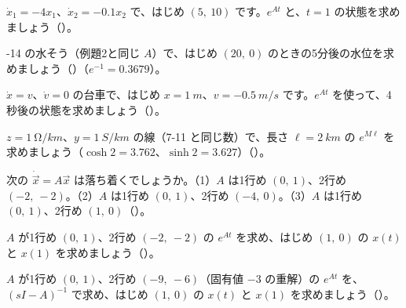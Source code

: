 \bkendproblems
{}

\bkproblem $\dot x_1=-4x_1$、$\dot x_2=-0.1x_2$ で、はじめ $(5,\ 10)$ です。$e^{At}$ と、$t=1$ の状態を求めましょう\mbox{（）}。

-14 の水そう（例題2と同じ $A$）で、はじめ $(20,\ 0)$ のときの5分後の水位を求めましょう\mbox{（）}（$e^{-1}=0.3679$）。

\bkproblem $\dot x=v$、$\dot v=0$ の台車で、はじめ $x=\qty{1}{m}$、$v=\qty{-0.5}{m/s}$ です。$e^{At}$ を使って、4秒後の状態を求めましょう\mbox{（）}。

\bkproblem $z=\qty{1}{\ohm/km}$、$y=\qty{1}{S/km}$ の線（7-11 と同じ数）で、長さ $\ell=\qty{2}{km}$ の $e^{M\ell}$ を求めましょう（$\cosh2=3.762$、$\sinh2=3.627$）\mbox{（）}。

\bkproblem 次の $\dot{\vec x}=A\vec x$ は落ち着くでしょうか。（1）$A$ は1行め $(0,\ 1)$、2行め $(-2,\ -2)$。（2）$A$ は1行め $(0,\ 1)$、2行め $(-4,\ 0)$。（3）$A$ は1行め $(0,\ 1)$、2行め $(1,\ 0)$\mbox{（）}。


\bkproblem $A$ が1行め $(0,\ 1)$、2行め $(-2,\ -2)$ の $e^{At}$ を求め、はじめ $(1,\ 0)$ の $x(t)$ と $x(1)$ を求めましょう\mbox{（）}。

\bkproblem $A$ が1行め $(0,\ 1)$、2行め $(-9,\ -6)$（固有値 $-3$ の重解）の $e^{At}$ を、$(sI-A)^{-1}$ で求め、はじめ $(1,\ 0)$ の $x(t)$ と $x(1)$ を求めましょう\mbox{（）}。

